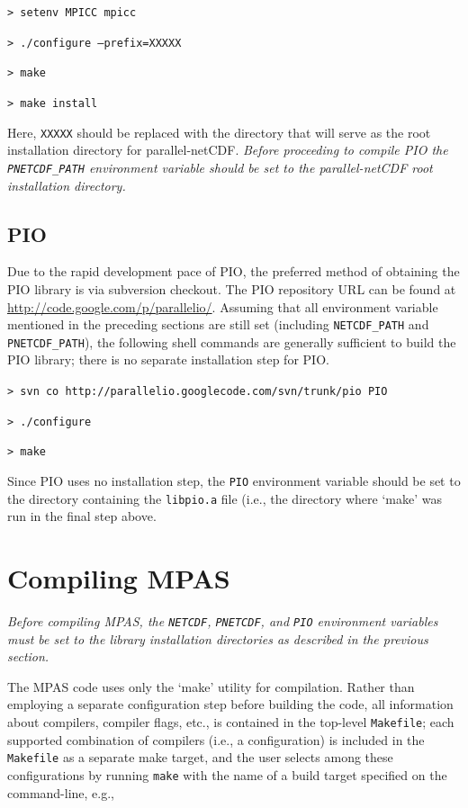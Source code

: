 \documentclass[11pt]{report}
\begin{document}
{\tt > setenv MPICC mpicc}  

{\tt > ./configure --prefix=XXXXX} 

{\tt > make}

{\tt > make install}
\vspace{12pt}

Here, {\tt XXXXX} should be replaced with the directory that will serve as the root installation directory for parallel-netCDF.
{\em Before proceeding to compile PIO the {\tt PNETCDF\_PATH} environment variable should be set to the parallel-netCDF root installation directory.}


\subsection{PIO}

Due to the rapid development pace of PIO, the preferred method of obtaining the PIO library is via subversion checkout. The PIO repository URL
can be found at \url{http://code.google.com/p/parallelio/}.
Assuming that all environment variable mentioned in the preceding sections are still set (including {\tt NETCDF\_PATH} and {\tt PNETCDF\_PATH}), the following shell commands are generally sufficient to build the PIO library; there is no separate installation step for PIO.

\vspace{12pt}
{\tt > svn co http://parallelio.googlecode.com/svn/trunk/pio PIO}

{\tt > ./configure}

{\tt > make} 
\vspace{12pt}

Since PIO uses no installation step, the {\tt PIO} environment variable should be set to the directory containing the {\tt libpio.a} file (i.e., the directory where `make' was run in the final step above.


\section{Compiling MPAS}

{\em Before compiling MPAS, the {\tt NETCDF}, {\tt PNETCDF}, and {\tt PIO} environment variables must be set to the library installation directories as
described in the previous section.}

The MPAS code uses only the `make' utility for compilation. Rather than employing a separate configuration step
before building the code, all information about compilers, compiler flags, etc., is contained in the top-level {\tt Makefile}; each
supported combination of compilers (i.e., a configuration) is included in the {\tt Makefile} as a separate make target, and the user selects among
these configurations by running {\tt make} with the name of a build target specified on the command-line, e.g.,
\end{document}
